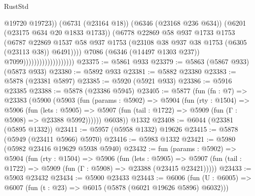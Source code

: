 \begin{lexlean}{RustStd}
\begin{coremodule}
                                                @19720
                                                @19723))
                                            (@6731 (@23164 @18))
                                            (@6346 (@23168 @236 @634))
                                            (@6201 (@23175 @634 @20 @1833 @1733))
                                            (@6778
                                              @22869
                                              @58
                                              @937
                                              @1733
                                              @1753
                                              (@6787
                                                @22869
                                                @1537
                                                @58
                                                @937
                                                @1753
                                                (@23108
                                                  @38
                                                  @937
                                                  @38
                                                  @1753
                                                  (@6305 (@23113 @38))
                                                  @6491))))
                                          @7086
                                          (@6346 (@14497 @1303 @237))
                                          @7099)))))))))))))))))))
@23375 := @5861 @933
@23379 := @5863 (@5867 @933) (@5873 @933)
@23380 := @5892 @933
@23381 := @5882 @23380
@23383 := @5878 (@23381 @5897)
@23385 := @5920 (@5921 @933)
@23386 := @5916 @23385
@23388 := @5878 (@23386 @5945)
@23405 := @5877
    (fun (fn : @7) =>
    @23383
      (@5900
        (@5903
          (fun (params : @5902) =>
          @5904
            (fun (rty : @1504) =>
            @5906
              (fun (lets : @5905) =>
              @5907 (fun (tail : @1722) => @5909 (fun (Γ : @5908) => @23388 @5992))))))
        @6038))
    @1332
@23408 := @6044 (@23381 (@5895 @1332))
@23411 := @5957 (@5958 @1332) @19626
@23415 := @5878 (@5949 (@23411 @5966) @5970)
@23416 := @5983 @1332
@23421 := @5980 (@5982 @23416 @19629 @5938 @5940)
@23432 := fun (params : @5902) =>
  @5904
    (fun (rty : @1504) =>
    @5906
      (fun (lets : @5905) =>
      @5907 (fun (tail : @1722) => @5909 (fun (Γ : @5908) => @23388 (@23415 @23421)))))
@23433 := @5903 @23432
@23434 := @5900 @23433
@23443 := @6006
    (fun (U : @6005) => @6007 (fun (t : @23) => @6015 (@5878 (@6021 @19626 @5896) @6032)))

\end{coremodule}
\end{lexlean}
